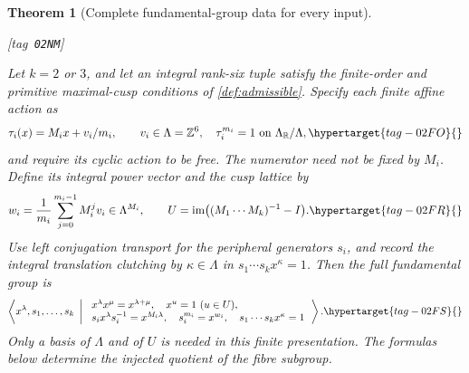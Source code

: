 \documentclass[11pt,a4paper]{article}
\numberwithin{equation}{section}
\newtheorem{theorem}{Theorem}[section]
\theoremstyle{definition}
\newcommand{\StatementRecord}[4]{{\upshape\footnotesize[tag~\texttt{#3}]}\enspace\ignorespaces}
\begin{document}
\begin{theorem}[Complete fundamental-group data for every input]\hypertarget{tag-02NM}{}\label{maps:src:F.2.31}
\StatementRecord{maps:src:F.2.31}{proved}{02NM}{\cref{maps:src:E.1.3}; \cite[Theorems 2.3--2.4, p.~425; Euler-characteristic comparison, pp.~427--428]{rootScott83}}


Let $k=2$ or $3$, and let an integral rank-six tuple satisfy the
finite-order and primitive maximal-cusp conditions of \cref{def:admissible}.    Specify each finite affine action as
\begin{equation}
 \tau_i(x)=M_ix+v_i/m_i,\qquad v_i\in\Lambda=\mathbb Z^6,
 \quad \tau_i^{m_i}=1\text{ on }\Lambda_{\mathbb R}/\Lambda,
 \hypertarget{tag-02FO}{}\label{maps:eq:F.G1}
\end{equation}
and require its cyclic action to be free.  The numerator need not be
fixed by $M_i$.  Define its integral power vector and the cusp
lattice by
\begin{equation}
 w_i=\frac1{m_i}\sum_{j=0}^{m_i-1}M_i^jv_i\in\Lambda^{M_i},
 \qquad U=\operatorname{im}\bigl((M_1\cdots M_k)^{-1}-I\bigr).
 \hypertarget{tag-02FR}{}\label{maps:eq:F.G2}
\end{equation}
Use left conjugation transport for the peripheral generators $s_i$,
and record the integral translation clutching by $\kappa\in\Lambda$
in $s_1\cdots s_kx^\kappa=1$.  Then the full fundamental group is
\begin{equation}
 \left\langle x^\lambda,s_1,\ldots,s_k\ \left|\
 \begin{array}{l}
 x^\lambda x^\mu=x^{\lambda+\mu},\quad x^u=1\ (u\in U),\\
 s_ix^\lambda s_i^{-1}=x^{M_i\lambda},\quad
 s_i^{m_i}=x^{w_i},\quad s_1\cdots s_kx^\kappa=1
 \end{array}\right.\right\rangle .                         \hypertarget{tag-02FS}{}\label{maps:eq:F.G3}
\end{equation}
Only a basis of $\Lambda$ and of $U$ is needed in this finite
presentation. The formulas below determine the injected quotient
of the fibre subgroup.


\end{theorem}
\end{document}
